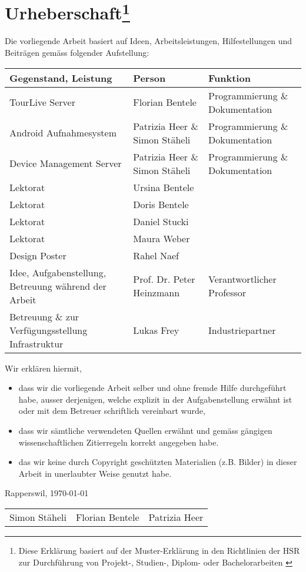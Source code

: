 \chapter*{Urheberschaft\footnote{Diese Erklärung basiert auf der Muster-Erklärung in den Richtlinien der HSR zur Durchführung
von Projekt-, Studien-, Diplom- oder Bachelorarbeiten \cite{hsrerklaerung}}}


Die vorliegende Arbeit basiert auf Ideen, Arbeitsleistungen, Hilfestellungen und Beiträgen gemäss folgender Aufstellung:

\begin{longtable}{p{4cm}|p{4cm}|p{4cm}}
\hline 
\textbf{Gegenstand, Leistung} & \textbf{Person} & \textbf{Funktion} \\ 
\hline 
\hline
TourLive Server & Florian Bentele & Programmierung \& Dokumentation \\ 
\hline 
Android Aufnahmesystem & Patrizia Heer \& Simon Stäheli & Programmierung \& Dokumentation \\ 
\hline 
Device Management Server & Patrizia Heer \& Simon Stäheli & Programmierung \& Dokumentation \\ 
\hline 
Lektorat & Ursina Bentele &  \\ 
\hline 
Lektorat & Doris Bentele &  \\ 
\hline 
Lektorat & Daniel Stucki &  \\ 
\hline 
Lektorat & Maura Weber &  \\ 
\hline
Design Poster & Rahel Naef &  \\ 
\hline  
Idee, Aufgabenstellung, Betreuung während der Arbeit & Prof. Dr. Peter Heinzmann & Verantwortlicher Professor \\
\hline
Betreuung \& zur Verfügungsstellung Infrastruktur & Lukas Frey & Industriepartner \\
\hline

\end{longtable} 

Wir erklären hiermit, 
\begin{itemize}
	\item dass wir die vorliegende Arbeit selber und ohne fremde Hilfe durchgeführt habe, ausser derjenigen, welche explizit in der Aufgabenstellung erwähnt ist oder mit dem Betreuer schriftlich vereinbart wurde,
	\item dass wir sämtliche verwendeten Quellen erwähnt und gemäss gängigen wissenschaftlichen Zitierregeln korrekt angegeben habe.
	\item das wir keine durch Copyright geschützten Materialien (z.B. Bilder) in dieser Arbeit in unerlaubter Weise genutzt habe. 
\end{itemize}

Rapperswil, \today

\vspace{10 mm}
\begin{tabular*}{\textwidth}{c @{\extracolsep{\fill}} cc}
\hline
Simon Stäheli & Florian Bentele & Patrizia Heer \\
\end{tabular*}